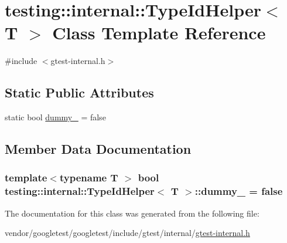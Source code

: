 \hypertarget{classtesting_1_1internal_1_1TypeIdHelper}{}\section{testing\+:\+:internal\+:\+:Type\+Id\+Helper$<$ T $>$ Class Template Reference}
\label{classtesting_1_1internal_1_1TypeIdHelper}


{\ttfamily \#include $<$gtest-\/internal.\+h$>$}

\subsection*{Static Public Attributes}
\begin{DoxyCompactItemize}
\item 
static bool \hyperlink{classtesting_1_1internal_1_1TypeIdHelper_a372268b1520d965d0bdf01ebad3d270e}{dummy\+\_\+} = false
\end{DoxyCompactItemize}


\subsection{Member Data Documentation}
\subsubsection[{\texorpdfstring{dummy\+\_\+}{dummy_}}]{\setlength{\rightskip}{0pt plus 5cm}template$<$typename T $>$ bool {\bf testing\+::internal\+::\+Type\+Id\+Helper}$<$ T $>$\+::dummy\+\_\+ = false\hspace{0.3cm}{\ttfamily [static]}}\hypertarget{classtesting_1_1internal_1_1TypeIdHelper_a372268b1520d965d0bdf01ebad3d270e}{}\label{classtesting_1_1internal_1_1TypeIdHelper_a372268b1520d965d0bdf01ebad3d270e}


The documentation for this class was generated from the following file\+:\begin{DoxyCompactItemize}
\item 
vendor/googletest/googletest/include/gtest/internal/\hyperlink{gtest-internal_8h}{gtest-\/internal.\+h}\end{DoxyCompactItemize}
